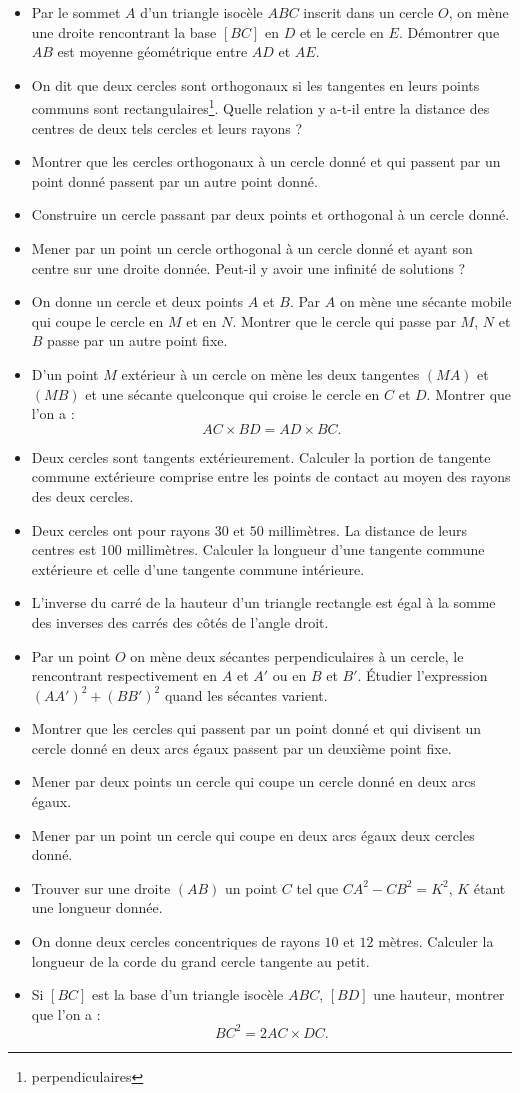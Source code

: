 \documentclass[12 pt]{report}
\theoremstyle{plain}
\newcounter{n}
\renewcommand{\it}{\item[$\mathbf{\then}.$]\stepcounter{n} }
\begin{document}
\begin{itemize}
\it Par le sommet $A$ d'un triangle isocèle $ABC$ inscrit dans un cercle $O$, on mène une droite rencontrant la base $[BC]$ en $D$ et le cercle en $E$. Démontrer que $AB$ est moyenne géométrique entre $AD$ et $AE$. 
\it On dit que deux cercles sont orthogonaux si les tangentes en leurs points communs sont rectangulaires\footnote{perpendiculaires}. Quelle relation y a-t-il entre la distance des centres de deux tels cercles et leurs rayons ? 
\it Montrer que les cercles orthogonaux à un cercle donné et qui passent par un point donné passent par un autre point donné. 
\it Construire un cercle passant par deux points et orthogonal à un cercle donné. 
\it Mener par un point un cercle orthogonal à un cercle donné et ayant son centre sur une droite donnée. Peut-il y avoir une infinité de solutions ? 
\it On donne un cercle et deux points $A$ et $B$. Par $A$ on mène une sécante mobile qui coupe le cercle en $M$ et en $N$. Montrer que le cercle qui passe par $M$, $N$ et $B$ passe par un autre point fixe.
\it D'un point $M$ extérieur à un cercle on mène les deux tangentes $(MA)$ et $(MB)$ et une sécante quelconque qui croise le cercle en $C$ et $D$. Montrer que l'on a : \[AC\times BD = AD\times BC.\]
\it Deux cercles sont tangents extérieurement. Calculer la portion de 
tangente commune extérieure comprise entre les points de contact au moyen des rayons des deux cercles. 
\it Deux cercles ont pour rayons $30$ et $50$ millimètres. La distance de leurs centres est $100$ millimètres. Calculer la longueur d'une tangente commune extérieure et celle d'une tangente commune intérieure. 
\it L'inverse du carré de la hauteur d'un triangle rectangle est égal à la somme des inverses des carrés des côtés de l'angle droit. 
\it Par un point $O$ on mène deux sécantes perpendiculaires à un cercle, le rencontrant respectivement en $A$ et $A'$ ou en $B$ et $B'$. Étudier l'expression $(AA')^2 + (BB')^2$ quand les sécantes varient.
\it Montrer que les cercles qui passent par un point donné et qui divisent un cercle donné en deux arcs égaux passent par un deuxième point fixe. 
\it Mener par deux points un cercle qui coupe un cercle donné en deux arcs égaux. 
\it Mener par un point un cercle qui coupe en deux arcs égaux deux cercles donné. 
\it Trouver sur une droite $(AB)$ un point $C$ tel que $CA^2-CB^2 = K^2$, $K$ étant une longueur donnée.
\it On donne deux cercles concentriques de rayons $10$ et $12$ mètres. Calculer la longueur de la corde du grand cercle tangente au petit. 
\it Si $[BC]$ est la base d'un triangle isocèle $ABC$, $[BD]$ une hauteur, montrer que l'on a : \[ BC^2=2AC\times DC.\]

\end{itemize}
\end{document}
